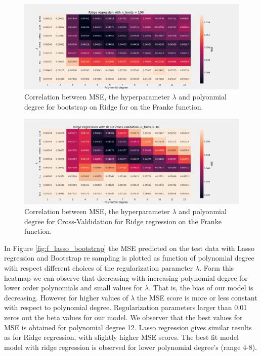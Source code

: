 \begin{figure}[H]
    \centering
    \caption{Correlation between MSE, the hyperparameter $\lambda$ and polyonmial degree for bootstrap on Ridge for on the Franke function.}  
    \label{fig:e_ridge} 
    \includegraphics[width=1\textwidth]{Figures/e_ridge_n_boots_100.png}
\end{figure}

\begin{figure}[H]
    \centering
    \includegraphics[width=\textwidth]{Figures/e_ridge_kfold_n_10.png}
    \caption{Correlation between MSE, the hyperparameter $\lambda$ and polyonmial degree for Cross-Valdidation for Ridge regression on the Franke function.}
    \label{fig:e_ridge_kfold}
\end{figure}




In Figure \ref{fig:f_lasso_bootstrap} the MSE predicted on the test data with
Lasso regression and Bootstrap re sampling is plotted as function of polynomial
degree with respect different choices of the regularization parameter $\lambda
$. Form this heatmap we can observe that decreasing with increasing polynomial
degree for lower order polynomials and small values for $\lambda $. That is,
the bias of our model is decreasing. However for higher values of $\lambda $
the MSE score is more or less constant with respect to polynomial degree.
Regularization parameters larger than 0.01 zeros out the beta values for our
model. We observer that the best values for MSE is obtained for polynomial
degree 12. Lasso regression gives similar results as for Ridge regression, with
slightly higher MSE scores. The best fit model model with ridge regression is
observed for lower polynomial degree's (range 4-8). 

